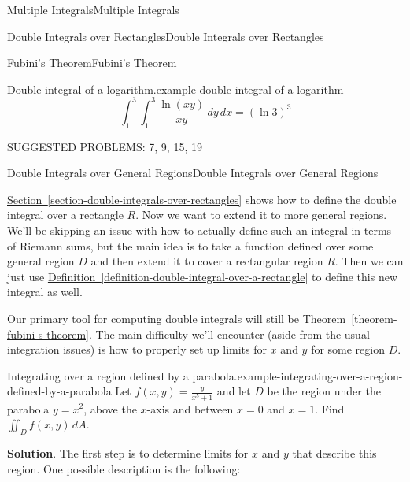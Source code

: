 \documentclass[10pt,]{book}
\numberwithin{equation}{section}
\begin{document}
\begin{chapterptx}{Multiple Integrals}{}{Multiple Integrals}{}{}
\begin{sectionptx}{Double Integrals over Rectangles}{}{Double Integrals over Rectangles}{}{}
\begin{subsectionptx}{Fubini's Theorem}{}{Fubini's Theorem}{}{}
\begin{example}{Double integral of a logarithm.}{example-double-integral-of-a-logarithm}
\begin{equation*}
\int_{1}^{3}\int_{1}^{3}\frac{\ln(xy)}{xy}\,dy\,dx = (\ln3)^{3}
\end{equation*}
\end{example}
\end{subsectionptx}
\begin{conclusion}{}%
\hypertarget{p-1252}{}%
SUGGESTED PROBLEMS: 7, 9, 15, 19%
\end{conclusion}%
\end{sectionptx}
%
%
\typeout{************************************************}
\typeout{************************************************}
%
\begin{sectionptx}{Double Integrals over General Regions}{}{Double Integrals over General Regions}{}{}\label{section-double-integrals-over-general-regions}
\begin{conclusion}{}%
\hypertarget{p-1253}{}%
\hyperref[section-double-integrals-over-rectangles]{Section~\ref{section-double-integrals-over-rectangles}} shows how to define the double integral over a rectangle \(R\). Now we want to extend it to more general regions. We'll be skipping an issue with how to actually define such an integral in terms of Riemann sums, but the main idea is to take a function defined over some general region \(D\) and then extend it to cover a rectangular region \(R\). Then we can just use \hyperref[definition-double-integral-over-a-rectangle]{Definition~\ref{definition-double-integral-over-a-rectangle}} to define this new integral as well.%
\par
\hypertarget{p-1254}{}%
Our primary tool for computing double integrals will still be \hyperref[theorem-fubini-s-theorem]{Theorem~\ref{theorem-fubini-s-theorem}}. The main difficulty we'll encounter (aside from the usual integration issues) is how to properly set up limits for \(x\) and \(y\) for some region \(D\).%
\end{conclusion}%
\begin{example}{Integrating over a region defined by a parabola.}{example-integrating-over-a-region-defined-by-a-parabola}%
\hypertarget{p-1255}{}%
Let \(f(x,y) = \frac{y}{x^{5}+1}\) and let \(D\) be the region under the parabola \(y = x^{2}\), above the \(x\)-axis and between \(x=0\) and \(x=1\). Find \(\iint_{D}f(x,y)\,dA\).%
\par\smallskip%
\noindent\textbf{Solution}.\hypertarget{solution-199}{}\quad%
\hypertarget{p-1256}{}%
The first step is to determine limits for \(x\) and \(y\) that describe this region. One possible description is the following:%

\end{example}
\end{sectionptx}
\end{chapterptx}
\end{document}
